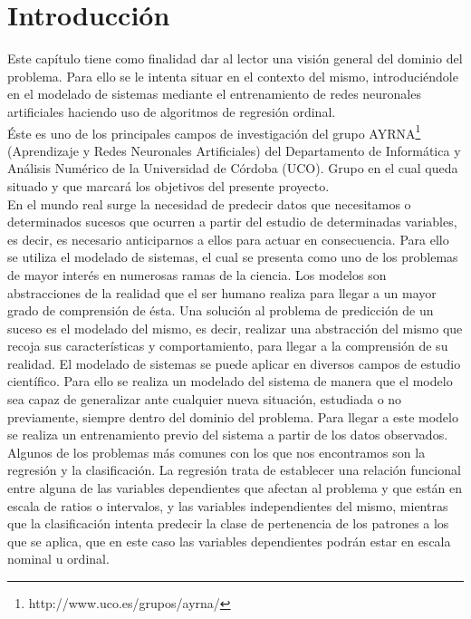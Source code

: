 \chapter{Introducción}
	
	Este capítulo tiene como finalidad dar al lector una visión general del dominio del problema. Para ello se le intenta situar en el contexto del mismo, introduciéndole en el modelado de sistemas mediante el entrenamiento de redes neuronales artificiales haciendo uso de algoritmos de regresión ordinal.\\

	Éste es uno de los principales campos de investigación del grupo AYRNA\footnote{http://www.uco.es/grupos/ayrna/} (Aprendizaje y Redes Neuronales Artificiales) del Departamento de Informática y Análisis Numérico de la Universidad de Córdoba (UCO). Grupo en el cual queda situado y que marcará los objetivos del presente proyecto.\\
	
	En el mundo real surge la necesidad de predecir datos que necesitamos o determinados sucesos que ocurren a partir del estudio de determinadas variables, es decir, es necesario anticiparnos a ellos para actuar en consecuencia. Para ello se utiliza el modelado de sistemas, el cual se presenta como uno de los problemas de mayor interés en numerosas ramas de la ciencia. Los modelos son abstracciones de la realidad que el ser humano realiza para llegar a un mayor grado de comprensión de ésta. Una solución al problema de predicción de un suceso es el modelado del mismo, es decir, realizar una abstracción del mismo que recoja sus características y comportamiento, para llegar a la comprensión de su realidad. El modelado de sistemas se puede aplicar en diversos campos de estudio científico. Para ello se realiza un modelado del sistema de manera que el modelo sea capaz de generalizar ante cualquier nueva situación, estudiada o no previamente, siempre dentro del dominio del problema. Para llegar a este modelo se realiza un entrenamiento previo del sistema a partir de los datos observados.\\

	Algunos de los problemas más comunes con los que nos encontramos son la regresión y la clasificación. La regresión trata de establecer una relación funcional entre alguna de las variables dependientes que afectan al problema y que están en escala de ratios o intervalos, y las variables independientes del mismo, mientras que la clasificación intenta predecir la clase de pertenencia de los patrones a los que se aplica, que en este caso las variables dependientes podrán estar en escala nominal u ordinal.\\


